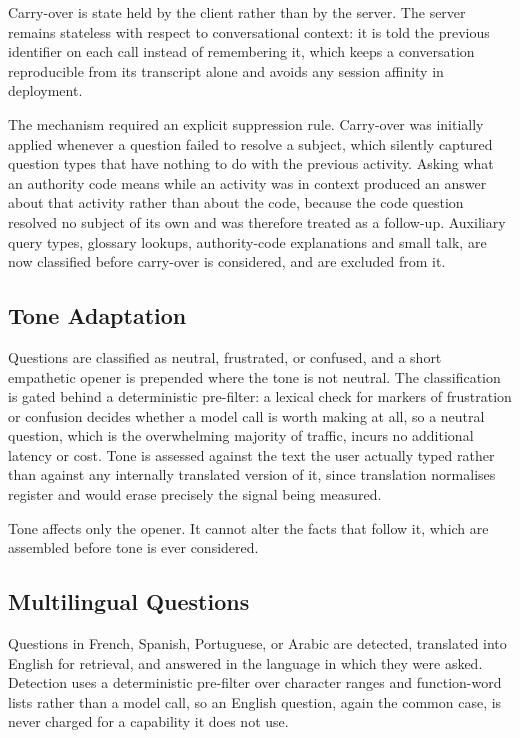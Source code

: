 Carry-over is state held by the client rather than by the server. The server remains
stateless with respect to conversational context: it is told the previous identifier on
each call instead of remembering it, which keeps a conversation reproducible from its
transcript alone and avoids any session affinity in deployment.

The mechanism required an explicit suppression rule. Carry-over was initially applied
whenever a question failed to resolve a subject, which silently captured question types
that have nothing to do with the previous activity. Asking what an authority code means
while an activity was in context produced an answer about that activity rather than about
the code, because the code question resolved no subject of its own and was therefore
treated as a follow-up. Auxiliary query types, glossary lookups, authority-code
explanations and small talk, are now classified before carry-over is considered, and are
excluded from it.

\subsection{Tone Adaptation}

Questions are classified as neutral, frustrated, or confused, and a short empathetic
opener is prepended where the tone is not neutral. The classification is gated behind a
deterministic pre-filter: a lexical check for markers of frustration or confusion decides
whether a model call is worth making at all, so a neutral question, which is the
overwhelming majority of traffic, incurs no additional latency or cost. Tone is assessed
against the text the user actually typed rather than against any internally translated
version of it, since translation normalises register and would erase precisely the signal
being measured.

Tone affects only the opener. It cannot alter the facts that follow it, which are
assembled before tone is ever considered.

\subsection{Multilingual Questions}

Questions in French, Spanish, Portuguese, or Arabic are detected, translated into English
for retrieval, and answered in the language in which they were asked. Detection uses a
deterministic pre-filter over character ranges and function-word lists rather than a model
call, so an English question, again the common case, is never charged for a capability it
does not use.

